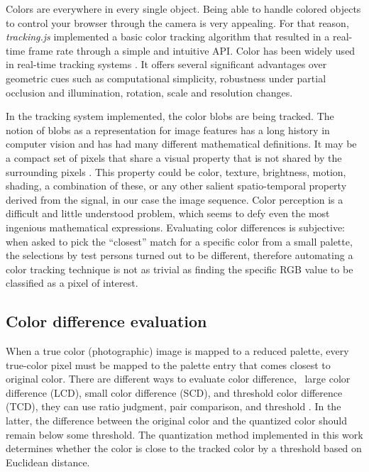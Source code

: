 Colors are everywhere in every single object. Being able to handle colored objects to control your browser through the camera is very appealing. For that reason, \textit{tracking.js} implemented a basic color tracking algorithm that resulted in a real-time frame rate through a simple and intuitive API.
Color has been widely used in real-time tracking systems \cite{Paschos2001}. It offers several significant advantages over geometric cues such as computational simplicity, robustness under partial occlusion and illumination, rotation, scale and resolution changes.

In the tracking system implemented, the color blobs are being tracked. The notion of blobs as a representation for image features has a long history in computer vision and has had many different mathematical definitions. It may be a compact set of pixels that share a visual property that is not shared by the surrounding pixels \cite{Kravtchenko1999}. This property could be color, texture, brightness, motion, shading, a combination of these, or any other salient spatio-temporal property derived from the signal, in our case the image sequence.
Color perception is a difficult and little understood problem, which seems to defy even the most ingenious mathematical expressions. Evaluating color differences is subjective: when asked to pick the ``closest'' match for a specific color from a small palette, the selections by test persons turned out to be different, therefore automating a color tracking technique is not as trivial as finding the specific RGB \cite{Gonzalez2007} value to be classified as a pixel of interest.


\subsection{Color difference evaluation} %
\label{sub:tracking_library_for_the_web:color_tracking_algorithm:color_difference_evaluation}

When a true color (photographic) image is mapped to a reduced palette, every true-color pixel must be mapped to the palette entry that comes closest to original color.
There are different ways to evaluate color difference, \ie\ large color difference (LCD), small color difference (SCD), and threshold color difference (TCD), they can use ratio judgment, pair comparison, and threshold \cite{Li2003}. In the latter, the difference between the original color and the quantized color should remain below some threshold. The quantization method implemented in this work determines whether the color is close to the tracked color by a threshold based on Euclidean distance.

